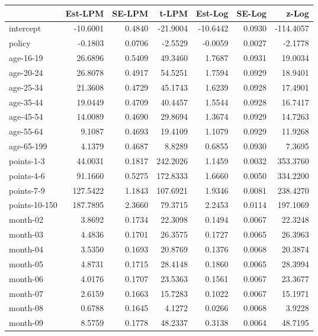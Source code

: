 \documentclass[10pt]{article}
\begin{document}
\begin{table}[ht]
\centering
\begin{tabular}{lrrrrrr}
  \hline
 & Est-LPM & SE-LPM & t-LPM & Est-Log & SE-Log & z-Log \\ 
  \hline
intercept & -10.6001 & 0.4840 & -21.9004 & -10.6442 & 0.0930 & -114.4057 \\ 
  policy & -0.1803 & 0.0706 & -2.5529 & -0.0059 & 0.0027 & -2.1778 \\ 
  age-16-19 & 26.6896 & 0.5409 & 49.3460 & 1.7687 & 0.0931 & 19.0034 \\ 
  age-20-24 & 26.8078 & 0.4917 & 54.5251 & 1.7594 & 0.0929 & 18.9401 \\ 
  age-25-34 & 21.3608 & 0.4729 & 45.1743 & 1.6239 & 0.0928 & 17.4901 \\ 
  age-35-44 & 19.0449 & 0.4709 & 40.4457 & 1.5544 & 0.0928 & 16.7417 \\ 
  age-45-54 & 14.0089 & 0.4690 & 29.8694 & 1.3674 & 0.0929 & 14.7263 \\ 
  age-55-64 & 9.1087 & 0.4693 & 19.4109 & 1.1079 & 0.0929 & 11.9268 \\ 
  age-65-199 & 4.1379 & 0.4687 & 8.8289 & 0.6855 & 0.0930 & 7.3695 \\ 
  points-1-3 & 44.0031 & 0.1817 & 242.2026 & 1.1459 & 0.0032 & 353.3760 \\ 
  points-4-6 & 91.1660 & 0.5275 & 172.8333 & 1.6660 & 0.0050 & 334.2200 \\ 
  points-7-9 & 127.5422 & 1.1843 & 107.6921 & 1.9346 & 0.0081 & 238.4270 \\ 
  points-10-150 & 187.7895 & 2.3660 & 79.3715 & 2.2453 & 0.0114 & 197.1069 \\ 
  month-02 & 3.8692 & 0.1734 & 22.3098 & 0.1494 & 0.0067 & 22.3248 \\ 
  month-03 & 4.4836 & 0.1701 & 26.3575 & 0.1727 & 0.0065 & 26.3963 \\ 
  month-04 & 3.5350 & 0.1693 & 20.8769 & 0.1376 & 0.0068 & 20.3874 \\ 
  month-05 & 4.8731 & 0.1715 & 28.4148 & 0.1860 & 0.0065 & 28.3994 \\ 
  month-06 & 4.0176 & 0.1707 & 23.5363 & 0.1561 & 0.0067 & 23.3677 \\ 
  month-07 & 2.6159 & 0.1663 & 15.7283 & 0.1022 & 0.0067 & 15.1971 \\ 
  month-08 & 0.6788 & 0.1645 & 4.1272 & 0.0266 & 0.0068 & 3.9228 \\ 
  month-09 & 8.5759 & 0.1778 & 48.2337 & 0.3138 & 0.0064 & 48.7195 \\ 

\end{tabular}
\end{table}
\end{document}
